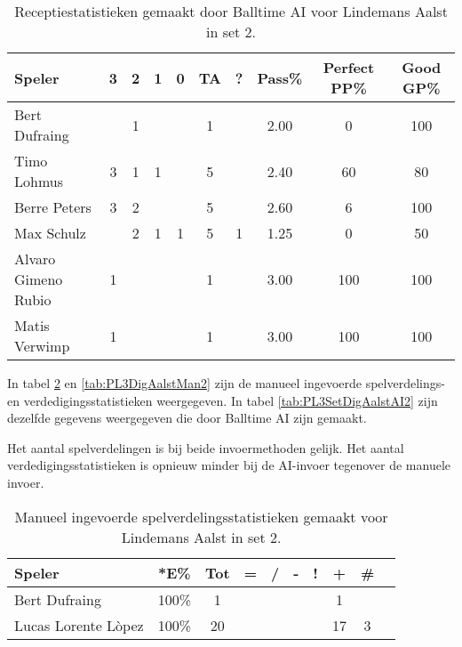 \begin{table}[ht!]
  \centering
  \scriptsize
  \begin{tabular}{|l|c|c|c|c|c|c|c|c|c|} \hline
    \textbf{Speler} & 3 & 2 & 1 & 0 & TA & ? & Pass\% & Perfect PP\% & Good GP\% \\ \hline
    Bert Dufraing &  &  1 &  &  & 1 &  & 2.00 & 0 & 100 \\
    Timo Lohmus & 3 & 1 & 1 &   & 5 &  & 2.40 & 60 & 80 \\
    Berre Peters & 3 & 2 &   &  & 5 &  & 2.60 & 6 & 100 \\
    Max Schulz &   & 2 & 1 & 1 & 5 & 1 & 1.25 & 0 & 50  \\
    Alvaro Gimeno Rubio & 1 &   &   &  & 1 &  & 3.00 & 100 & 100 \\
    Matis Verwimp & 1 &   &   &  & 1 &  & 3.00 & 100 & 100 \\ \hline
  \end{tabular}
  \caption[Receptiestatistieken gemaakt door Balltime AI voor Lindemans Aalst in set 2]{\label{tab:PL3ReceiveAalstAI2}Receptiestatistieken gemaakt door Balltime AI voor Lindemans Aalst in set 2.}
\end{table}

In tabel \ref{tab:PL3SetAalstMan2} en \ref{tab:PL3DigAalstMan2} zijn de manueel ingevoerde spelverdelings- en verdedigingsstatistieken weergegeven. In tabel \ref{tab:PL3SetDigAalstAI2} zijn dezelfde gegevens weergegeven die door Balltime AI zijn gemaakt.

Het aantal spelverdelingen is bij beide invoermethoden gelijk. Het aantal verdedigingsstatistieken is opnieuw minder bij de AI-invoer tegenover de manuele invoer.

\begin{table}[ht!]
    \centering
    \scriptsize
    \begin{tabular}{|l|c|c|c|c|c|c|c|c|c|}
        \hline
        \textbf{Speler} & *E\% & Tot & = & / & - & ! & + & \# \\ \hline
        Bert Dufraing & 100\% & 1 &  &  & &  & 1 & \\ 
        Lucas Lorente Lòpez & 100\% & 20 &  &  & & & 17 & 3 \\ \hline
    \end{tabular}
    \caption[Manueel ingevoerde spelverdelingsstatistieken gemaakt voor Lindemans Aalst in set 2]{\label{tab:PL3SetAalstMan2}Manueel ingevoerde spelverdelingsstatistieken gemaakt voor Lindemans Aalst in set 2.}
\end{table}

